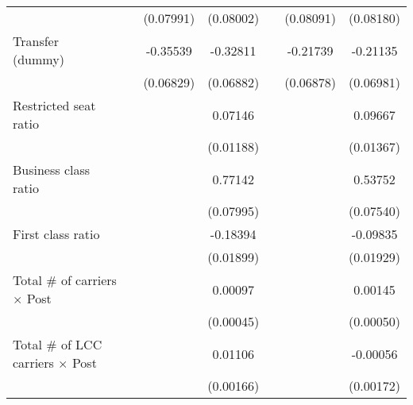 \begin{table}[htbp]
\begin{tabular}{l*{6}{c}}
                    &                     &   (0.07991)         &   (0.08002)         &                     &   (0.08091)         &   (0.08180)         \\
\addlinespace
\shortstack{Transfer \\ (dummy)}&                     &    -0.35539\sym{***}&    -0.32811\sym{***}&                     &    -0.21739\sym{***}&    -0.21135\sym{***}\\
                    &                     &   (0.06829)         &   (0.06882)         &                     &   (0.06878)         &   (0.06981)         \\
\addlinespace
Restricted seat ratio&                     &                     &     0.07146\sym{***}&                     &                     &     0.09667\sym{***}\\
                    &                     &                     &   (0.01188)         &                     &                     &   (0.01367)         \\
\addlinespace
Business class ratio&                     &                     &     0.77142\sym{***}&                     &                     &     0.53752\sym{***}\\
                    &                     &                     &   (0.07995)         &                     &                     &   (0.07540)         \\
\addlinespace
First class ratio   &                     &                     &    -0.18394\sym{***}&                     &                     &    -0.09835\sym{***}\\
                    &                     &                     &   (0.01899)         &                     &                     &   (0.01929)         \\
\addlinespace
Total # of carriers $\times$ Post&                     &                     &     0.00097\sym{**} &                     &                     &     0.00145\sym{***}\\
                    &                     &                     &   (0.00045)         &                     &                     &   (0.00050)         \\
\addlinespace
Total # of LCC carriers $\times$ Post&                     &                     &     0.01106\sym{***}&                     &                     &    -0.00056         \\
                    &                     &                     &   (0.00166)         &                     &                     &   (0.00172)         \\

\end{tabular}
\end{table}
